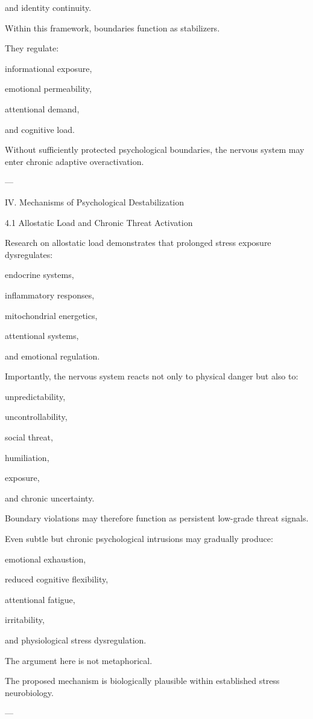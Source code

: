 and identity continuity.


Within this framework, boundaries function as stabilizers.

They regulate:

informational exposure,

emotional permeability,

attentional demand,

and cognitive load.


Without sufficiently protected psychological boundaries, the nervous system may enter chronic adaptive overactivation.


---

IV. Mechanisms of Psychological Destabilization

4.1 Allostatic Load and Chronic Threat Activation

Research on allostatic load demonstrates that prolonged stress exposure dysregulates:

endocrine systems,

inflammatory responses,

mitochondrial energetics,

attentional systems,

and emotional regulation.


Importantly, the nervous system reacts not only to physical danger but also to:

unpredictability,

uncontrollability,

social threat,

humiliation,

exposure,

and chronic uncertainty.


Boundary violations may therefore function as persistent low-grade threat signals.

Even subtle but chronic psychological intrusions may gradually produce:

emotional exhaustion,

reduced cognitive flexibility,

attentional fatigue,

irritability,

and physiological stress dysregulation.


The argument here is not metaphorical.

The proposed mechanism is biologically plausible within established stress neurobiology.


---


